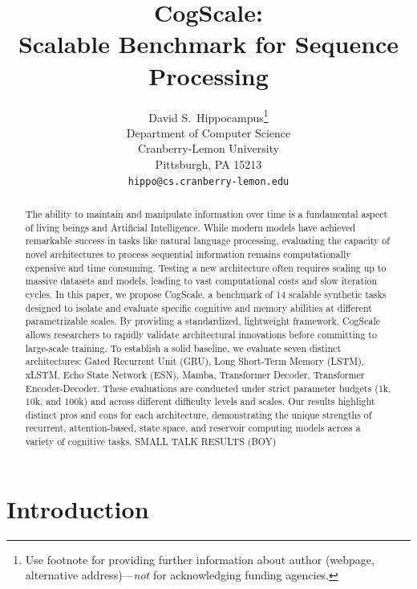 \documentclass{article}
\title{CogScale:\\Scalable Benchmark for Sequence Processing}
\author{%
  David S.~Hippocampus\thanks{Use footnote for providing further information
    about author (webpage, alternative address)---\emph{not} for acknowledging
    funding agencies.} \\
  Department of Computer Science\\
  Cranberry-Lemon University\\
  Pittsburgh, PA 15213 \\
  \texttt{hippo@cs.cranberry-lemon.edu} \\
}
\begin{document}
\newcommand{\xav}[1]
{\stepcounter{xaviercounter}
 {\color{blue} #1 (XH\thexaviercounter)}
 }


\newcommand{\yannis}[1]
{\stepcounter{yanniscounter}
 {\color{red} #1 (BOY\thexaviercounter)}
 }



\maketitle


\begin{abstract}
  The ability to maintain and manipulate information over time is a fundamental aspect of living beings and Artificial Intelligence.
  While modern models have achieved remarkable success in tasks like natural language processing, evaluating the capacity of novel architectures to process sequential information remains computationally expensive and time consuming. Testing a new architecture often requires scaling up to massive datasets and models, leading to vast computational costs and slow iteration cycles. In this paper, we propose CogScale, a benchmark of 14 scalable synthetic tasks designed to isolate and evaluate specific cognitive and memory abilities at different parametrizable scales. By providing a standardized, lightweight framework, CogScale allows researchers to rapidly validate architectural innovations before committing to large-scale training. To establish a solid baseline,
  we evaluate seven distinct architectures: Gated Recurrent Unit (GRU), Long Short-Term Memory (LSTM), xLSTM, Echo State Network (ESN), Mamba, Transformer Decoder, Transformer Encoder-Decoder. These evaluations are conducted under strict parameter budgets (1k, 10k, and 100k) and across different difficulty levels and scales. Our results highlight distinct pros and cons for each architecture, demonstrating the unique strengths of recurrent, attention-based, state space, and reservoir computing models across a variety of cognitive tasks.
  \yannis{SMALL TALK RESULTS}
\end{abstract}




\section{Introduction}

\end{document}
